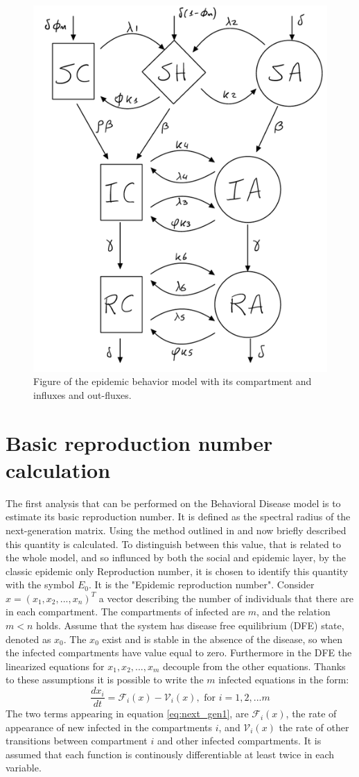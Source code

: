 \begin{figure}[h]
	\centering
	\includegraphics[width=0.5\linewidth]{1_corpo/figure/epi_behaviour_model_figure}
	\caption[Epidemic behavior model]{Figure of the epidemic behavior model with its compartment and influxes and out-fluxes.}
	\label{fig:epibehaviourmodelfigure}
\end{figure}

\section{Basic reproduction number calculation}
The first analysis that can be performed on the Behavioral Disease model is to estimate its basic reproduction number. It is defined as the spectral radius of the next-generation matrix. Using the method outlined in \cite{van_den_Driessche_2017} and now briefly described this quantity is calculated. To distinguish between this value, that is related to the whole model, and so influnced by both the social and epidemic layer, by the classic epidemic only Reproduction number, it is chosen to identify this quantity with the symbol $E_0$. It is the "Epidemic reproduction number". 
Consider $x = (x_1,x_2,...,x_n)^T$ a vector describing the number of individuals that there are in each compartment. The compartments of infected are $m$, and the relation $m < n$ holds. 
Assume that the system has disease free equilibrium (DFE) state, denoted as $x_0$. The $x_0$ exist and is stable in the absence of the disease, so when the infected compartments have value equal to zero. Furthermore in the DFE the linearized equations for $x_1,x_2,...,x_m$ decouple from the other equations. Thanks to these assumptions it is possible to write the $m$ infected equations in the form:
\begin{equation}
\label{eq:next_gen1}
\frac{dx_i}{dt} = \mathcal{F}_i(x) - \mathcal{V}_i(x), \text{ for } i =1,2,...m
\end{equation}
The two terms appearing in equation \ref{eq:next_gen1}, are $\mathcal{F}_i(x)$, the rate of appearance of new infected in the compartments $i$, and $ \mathcal{V}_i(x)$ the rate of other transitions between compartment $i$ and other infected compartments. It is assumed that each function is continously differentiable at least twice in each variable.

